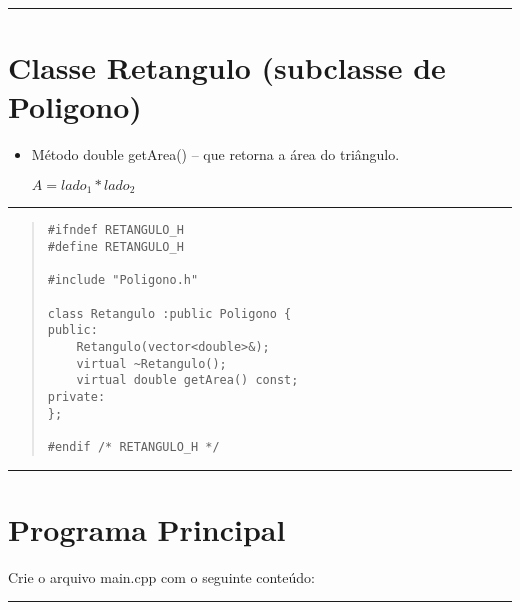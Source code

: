 \documentclass[12pt]{article}
\begin{document}
\par\noindent\rule{\textwidth}{0.4pt}

\section*{Classe {\sf Retangulo} (subclasse de {\sf Poligono})}

\begin{itemize}

\item Método {\sf double getArea()} -- que retorna a área do triângulo.

$A = \displaystyle lado_1 * lado_2$ 
\end{itemize}

\par\noindent\rule{\textwidth}{0.4pt}

\begin{quote}
\begin{scriptsize}
\begin{verbatim}
#ifndef RETANGULO_H
#define RETANGULO_H

#include "Poligono.h"

class Retangulo :public Poligono {
public:
    Retangulo(vector<double>&);
    virtual ~Retangulo(); 
    virtual double getArea() const;
private:
};

#endif /* RETANGULO_H */
\end{verbatim}
\end{scriptsize}
\end{quote}

\par\noindent\rule{\textwidth}{0.4pt}

\section*{Programa Principal}

Crie o arquivo {\sf main.cpp} com o seguinte conteúdo:

\par\noindent\rule{\textwidth}{0.4pt}
\end{document}
